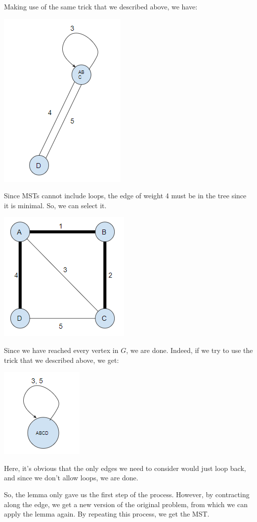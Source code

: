 \documentclass[letterpaper]{article}
\begin{document}
\begin{mdframed}[]
\begin{center}
    \end{center}
    Making use of the same trick that we described above, we have: 
    \begin{center}
        \includegraphics[scale=0.8]{assets/mst_3a.png}
    \end{center}
    Since MSTs cannot include loops, the edge of weight 4 must be in the tree since it is minimal. So, we can select it.
    \begin{center}
        \includegraphics[scale=0.8]{assets/mst_4.png}
    \end{center}
    Since we have reached every vertex in $G$, we are done. Indeed, if we try to use the trick that we described above, we get: 
    \begin{center}
        \includegraphics[scale=0.8]{assets/mst_4a.png}
    \end{center}
    Here, it's obvious that the only edges we need to consider would just loop back, and since we don't allow loops, we are done. 
\end{mdframed}
So, the lemma only gave us the first step of the process. However, by contracting along the edge, we get a new version of the original problem, from which we can apply the lemma again. By repeating this process, we get the MST. 
\end{document}
